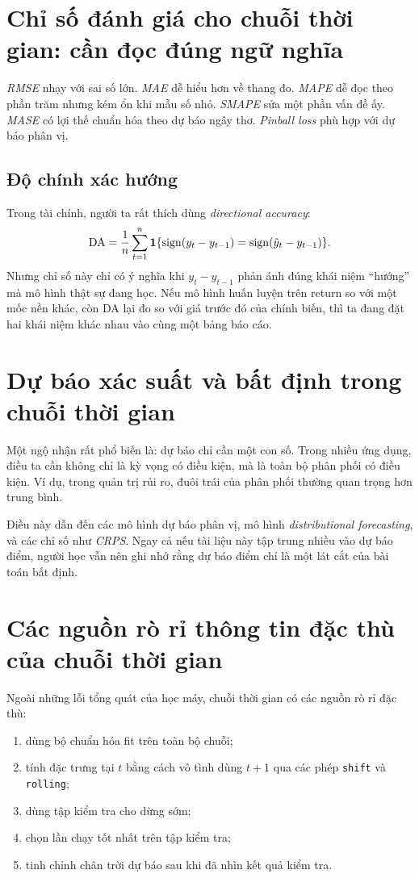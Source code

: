 \section{Chỉ số đánh giá cho chuỗi thời gian: cần đọc đúng ngữ nghĩa}

\emph{RMSE} nhạy với sai số lớn. \emph{MAE} dễ hiểu hơn về thang đo. \emph{MAPE} dễ đọc theo phần trăm nhưng kém ổn khi mẫu số nhỏ. \emph{SMAPE} sửa một phần vấn đề ấy. \emph{MASE} có lợi thế chuẩn hóa theo dự báo ngây thơ. \emph{Pinball loss} phù hợp với dự báo phân vị.

\subsection{Độ chính xác hướng}

Trong tài chính, người ta rất thích dùng \emph{directional accuracy}:
\[
\mathrm{DA}
=
\frac{1}{n}\sum_{t=1}^n
\mathbf{1}\{\mathrm{sign}(y_t-y_{t-1})=\mathrm{sign}(\hat{y}_t-y_{t-1})\}.
\]
Nhưng chỉ số này chỉ có ý nghĩa khi \(y_t-y_{t-1}\) phản ánh đúng khái niệm ``hướng'' mà mô hình thật sự đang học. Nếu mô hình huấn luyện trên return so với một mốc nền khác, còn DA lại đo so với giá trước đó của chính biến, thì ta đang đặt hai khái niệm khác nhau vào cùng một bảng báo cáo.

\section{Dự báo xác suất và bất định trong chuỗi thời gian}

Một ngộ nhận rất phổ biến là: dự báo chỉ cần một con số. Trong nhiều ứng dụng, điều ta cần không chỉ là kỳ vọng có điều kiện, mà là toàn bộ phân phối có điều kiện. Ví dụ, trong quản trị rủi ro, đuôi trái của phân phối thường quan trọng hơn trung bình.

Điều này dẫn đến các mô hình dự báo phân vị, mô hình \emph{distributional forecasting}, và các chỉ số như \emph{CRPS}. Ngay cả nếu tài liệu này tập trung nhiều vào dự báo điểm, người học vẫn nên ghi nhớ rằng dự báo điểm chỉ là một lát cắt của bài toán bất định.

\section{Các nguồn rò rỉ thông tin đặc thù của chuỗi thời gian}

Ngoài những lỗi tổng quát của học máy, chuỗi thời gian có các nguồn rò rỉ đặc thù:

\begin{enumerate}
\item dùng bộ chuẩn hóa fit trên toàn bộ chuỗi;
\item tính đặc trưng tại \(t\) bằng cách vô tình dùng \(t+1\) qua các phép \texttt{shift} và \texttt{rolling};
\item dùng tập kiểm tra cho dừng sớm;
\item chọn lần chạy tốt nhất trên tập kiểm tra;
\item tinh chỉnh chân trời dự báo sau khi đã nhìn kết quả kiểm tra.
\end{enumerate}

